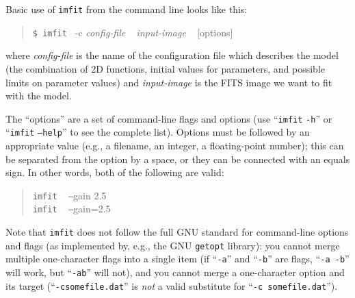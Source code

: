 \documentclass[10pt]{article}
\newcommand{\imfit}{\texttt{imfit}}
\begin{document}
Basic use of \imfit{} from the command line looks like this:
\begin{quote}
  \texttt{\$ \imfit{} }  -c \textit{config-file} ~ \textit{input-image} ~ [options]
\end{quote}
where \textit{config-file} is the name of the configuration file
which describes the model (the combination of 2D functions, initial values
for parameters, and possible limits on parameter values) and \textit{input-image}
is the FITS image we want to fit with the model.

The ``options'' are a set of command-line flags and options (use ``\imfit{} \texttt{-h}''
or ``\imfit{} \texttt{--help}'' to see the complete list). Options must be followed by
an appropriate value (e.g., a filename, an integer, a floating-point number); this can
be separated from the option by a space, or they can be connected with an equals sign.
In other words, both of the following are valid:
\begin{quote}
\imfit{} ~ \texttt{--}gain 2.5 \\
\imfit{} ~ \texttt{--}gain=2.5
\end{quote}
Note that \imfit{} does not follow the full GNU standard for
command-line options and flags (as implemented by, e.g., the GNU
\texttt{getopt} library): you cannot merge multiple one-character flags
into a single item (if ``\texttt{-a}'' and ``\texttt{-b}'' are flags,
``\texttt{-a -b}'' will work, but ``\texttt{-ab}'' will not), and you
cannot merge a one-character option and its target
(``\texttt{-csomefile.dat}'' is \textit{not} a valid substitute for
``\texttt{-c somefile.dat}'').

\bigskip
\end{document}
